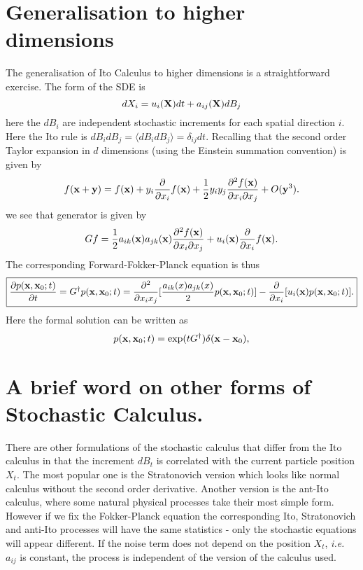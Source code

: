 \documentclass[11pt]{report}
\begin{document}
\section{Generalisation to higher dimensions}
The generalisation of Ito Calculus to higher dimensions is a straightforward exercise. The form of the SDE is
\begin{equation}
dX_i = u_i({\bf X}) dt+ a_{ij}({\bf X}) dB_j \label{itogen}
\end{equation}
here the $dB_i$ are independent stochastic increments for each spatial direction $i$. Here the  Ito rule is $dB_idB_j = \langle dB_i dB_j\rangle = \delta_{ij}dt$. Recalling that the second order Taylor expansion in $d$ dimensions (using the Einstein summation convention) is given by
\begin{equation}
f({\bf x} + {\bf y}) = f({\bf x}) + y_i {\partial \over \partial x_i}f({\bf x}) + \frac{1}{2}
y_i y_j \frac{\partial^2 f({\bf x})}{\partial x_i\partial x_j} +O({\bf y}^3).
\end{equation}
we see that generator is given by
\begin{equation}
Gf = \frac{1}{2}a_{ik}({\bf x})a_{jk}({\bf x}) \frac{\partial^2 f({\bf x})}{\partial x_i\partial x_j}
+ u_i({\bf x}) {\partial \over \partial x_i}f({\bf x}).
\end{equation}
The corresponding Forward-Fokker-Planck equation is thus
\begin{equation}
\boxed{
{\partial p({\bf x},{\bf x}_0;t)\over \partial t} = G^\dagger p({\bf x},{\bf x}_0;t)=\frac{\partial ^2}{\partial x_i x_j}[ \frac{a_{ik}(x)a_{jk}(x)}{2} p({\bf x},{\bf x}_0;t)]
- \frac{\partial}{\partial x_i}[ u_i({\bf x}) p({\bf x},{\bf x}_0;t)].}
\end{equation}
Here the formal solution can be written as
\begin{equation}
p({\bf x},{\bf x}_0;t) =\exp(tG^\dagger) \delta({\bf x}-{\bf x}_0),\label{schrod}
\end{equation}


\section{A brief word on other forms of Stochastic Calculus.} 
There are other formulations of the stochastic calculus that differ from the Ito calculus in that the increment $dB_t$ is correlated with the current particle position $X_t$. The most 
popular one is the Stratonovich version  which looks like normal calculus without the second order derivative. Another version is the ant-Ito calculus, where some natural physical processes take their most simple form. However if we fix the Fokker-Planck equation the corresponding Ito, Stratonovich and anti-Ito processes will have the same statistics - only the stochastic equations will appear different. If the noise term does not depend on the position $X_t$, {\em i.e.} $a_{ij}$ is constant, the process is independent of
the version of the calculus used.
\end{document}

